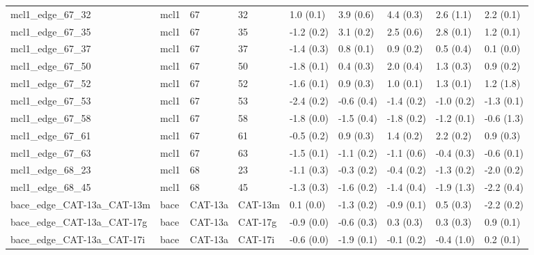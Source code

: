 \begin{tabular}{lllllllll}
mcl1\_edge\_67\_32                  &      mcl1 &          67 &          32 &   1.0 (0.1) &         3.9 (0.6) &   4.4 (0.3) &   2.6 (1.1) &   2.2 (0.1) \\
mcl1\_edge\_67\_35                  &      mcl1 &          67 &          35 &  -1.2 (0.2) &         3.1 (0.2) &   2.5 (0.6) &   2.8 (0.1) &   1.2 (0.1) \\
mcl1\_edge\_67\_37                  &      mcl1 &          67 &          37 &  -1.4 (0.3) &         0.8 (0.1) &   0.9 (0.2) &   0.5 (0.4) &   0.1 (0.0) \\
mcl1\_edge\_67\_50                  &      mcl1 &          67 &          50 &  -1.8 (0.1) &         0.4 (0.3) &   2.0 (0.4) &   1.3 (0.3) &   0.9 (0.2) \\
mcl1\_edge\_67\_52                  &      mcl1 &          67 &          52 &  -1.6 (0.1) &         0.9 (0.3) &   1.0 (0.1) &   1.3 (0.1) &   1.2 (1.8) \\
mcl1\_edge\_67\_53                  &      mcl1 &          67 &          53 &  -2.4 (0.2) &        -0.6 (0.4) &  -1.4 (0.2) &  -1.0 (0.2) &  -1.3 (0.1) \\
mcl1\_edge\_67\_58                  &      mcl1 &          67 &          58 &  -1.8 (0.0) &        -1.5 (0.4) &  -1.8 (0.2) &  -1.2 (0.1) &  -0.6 (1.3) \\
mcl1\_edge\_67\_61                  &      mcl1 &          67 &          61 &  -0.5 (0.2) &         0.9 (0.3) &   1.4 (0.2) &   2.2 (0.2) &   0.9 (0.3) \\
mcl1\_edge\_67\_63                  &      mcl1 &          67 &          63 &  -1.5 (0.1) &        -1.1 (0.2) &  -1.1 (0.6) &  -0.4 (0.3) &  -0.6 (0.1) \\
mcl1\_edge\_68\_23                  &      mcl1 &          68 &          23 &  -1.1 (0.3) &        -0.3 (0.2) &  -0.4 (0.2) &  -1.3 (0.2) &  -2.0 (0.2) \\
mcl1\_edge\_68\_45                  &      mcl1 &          68 &          45 &  -1.3 (0.3) &        -1.6 (0.2) &  -1.4 (0.4) &  -1.9 (1.3) &  -2.2 (0.4) \\
bace\_edge\_CAT-13a\_CAT-13m        &      bace &     CAT-13a &     CAT-13m &   0.1 (0.0) &        -1.3 (0.2) &  -0.9 (0.1) &   0.5 (0.3) &  -2.2 (0.2) \\
bace\_edge\_CAT-13a\_CAT-17g        &      bace &     CAT-13a &     CAT-17g &  -0.9 (0.0) &        -0.6 (0.3) &   0.3 (0.3) &   0.3 (0.3) &   0.9 (0.1) \\
bace\_edge\_CAT-13a\_CAT-17i        &      bace &     CAT-13a &     CAT-17i &  -0.6 (0.0) &        -1.9 (0.1) &  -0.1 (0.2) &  -0.4 (1.0) &   0.2 (0.1) \\

\end{tabular}
